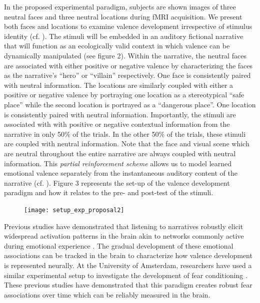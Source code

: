 \documentclass[12pt,a4paper]{article}\usepackage[]{graphicx}\usepackage[]{color}
\begin{document}
In the proposed experimental paradigm, subjects are shown images of three neutral faces and three neutral locations during fMRI acquisition. We present both faces and locations to examine valence development irrespective of stimulus identity (cf. \citealp{britton2006}). The stimuli will be embedded in an auditory fictional narrative that will function as an ecologically valid context in which valence can be dynamically manipulated (see figure 2). Within the narrative, the neutral faces are associated with either positive or negative valence by characterizing the faces as the narrative's ``hero'' or ``villain'' respectively. One face is consistently paired with neutral information. The locations are similarly coupled with either a positive or negative valence by portraying one location as a stereotypical ``safe place'' while the second location is portrayed as a ``dangerous place''. One location is consistently paired with neutral information. Importantly, the stimuli are associated with with positive or negative contextual information from the narrative in only 50\% of the trials. In the other 50\% of the trials, these stimuli are coupled with neutral information. Note that the face and visual scene which are neutral throughout the entire narrative are always coupled with neutral information. This \emph{partial reinforcement scheme} allows us to model learned emotional valence separately from the instantaneous auditory content of the narrative (cf. \citealp{visser2013}). Figure 3 represents the set-up of the valence development paradigm and how it relates to the pre- and post-test of the stimuli.

\begin{figure}[h]
\centering
\texttt{[image: setup\_exp\_proposal2]}
\end{figure}

Previous studies have demonstrated that listening to narratives robustly elicit widespread
activation patterns in the brain \citep{nijhof2015,wallentin2011} akin to networks commonly active during emotional experience \citep{sabatinelli2006}. The gradual development of these emotional associations can be tracked in the brain to characterize how valence development is represented neurally. At the University of Amsterdam, researchers have used a similar experimental setup to investigate the development of fear conditioning \citep{visser2013,visser2011}. These previous studies have demonstrated that this paradigm creates robust fear associations over time which can be reliably measured in the brain.
\end{document}
